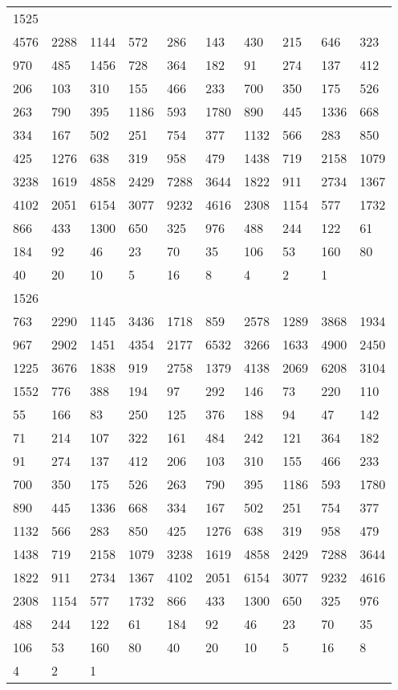 \begin{longtable}{*{10}{l}}
1525&&&&&&&&&\\
4576& 2288& 1144& 572& 286& 143& 430& 215& 646& 323\\
970& 485& 1456& 728& 364& 182& 91& 274& 137& 412\\
206& 103& 310& 155& 466& 233& 700& 350& 175& 526\\
263& 790& 395& 1186& 593& 1780& 890& 445& 1336& 668\\
334& 167& 502& 251& 754& 377& 1132& 566& 283& 850\\
425& 1276& 638& 319& 958& 479& 1438& 719& 2158& 1079\\
3238& 1619& 4858& 2429& 7288& 3644& 1822& 911& 2734& 1367\\
4102& 2051& 6154& 3077& 9232& 4616& 2308& 1154& 577& 1732\\
866& 433& 1300& 650& 325& 976& 488& 244& 122& 61\\
184& 92& 46& 23& 70& 35& 106& 53& 160& 80\\
40& 20& 10& 5& 16& 8& 4& 2& 1& \\

1526&&&&&&&&&\\
763& 2290& 1145& 3436& 1718& 859& 2578& 1289& 3868& 1934\\
967& 2902& 1451& 4354& 2177& 6532& 3266& 1633& 4900& 2450\\
1225& 3676& 1838& 919& 2758& 1379& 4138& 2069& 6208& 3104\\
1552& 776& 388& 194& 97& 292& 146& 73& 220& 110\\
55& 166& 83& 250& 125& 376& 188& 94& 47& 142\\
71& 214& 107& 322& 161& 484& 242& 121& 364& 182\\
91& 274& 137& 412& 206& 103& 310& 155& 466& 233\\
700& 350& 175& 526& 263& 790& 395& 1186& 593& 1780\\
890& 445& 1336& 668& 334& 167& 502& 251& 754& 377\\
1132& 566& 283& 850& 425& 1276& 638& 319& 958& 479\\
1438& 719& 2158& 1079& 3238& 1619& 4858& 2429& 7288& 3644\\
1822& 911& 2734& 1367& 4102& 2051& 6154& 3077& 9232& 4616\\
2308& 1154& 577& 1732& 866& 433& 1300& 650& 325& 976\\
488& 244& 122& 61& 184& 92& 46& 23& 70& 35\\
106& 53& 160& 80& 40& 20& 10& 5& 16& 8\\
4& 2& 1& \\


\end{longtable}
